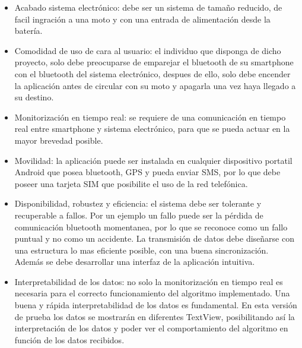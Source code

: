 		\begin{itemize}
			\item Acabado sistema electr\'onico: debe ser un sistema de tamaño reducido, de facil ingraci\'on a una moto y con una entrada de alimentaci\'on desde la bater\'ia.
			
			\item Comodidad de uso de cara al usuario: el individuo que disponga de dicho proyecto, solo debe preocuparse de emparejar el bluetooth de su smartphone con el bluetooth del sistema electr\'onico, despues de ello, solo debe encender la aplicaci\'on antes de circular con su moto y apagarla una vez haya llegado a su destino. 
			
			\item Monitorizaci\'on en tiempo real: se requiere de una comunicaci\'on en tiempo real entre smartphone y sistema electr\'onico, para que se pueda actuar en la mayor brevedad posible.
			
			\item Movilidad: la aplicaci\'on puede ser instalada en cualquier dispositivo portatil Android que posea bluetooth, GPS y pueda enviar SMS, por lo que debe poseer una tarjeta SIM que posibilite el uso de la red telef\'onica.
			
			\item Disponibilidad, robustez y eficiencia: el sistema debe ser tolerante y recuperable a fallos. Por un ejemplo un fallo puede ser la p\'erdida de comunicaci\'on bluetooth momentanea, por lo que se reconoce como un fallo puntual y no como un accidente. La transmisi\'on de datos debe diseñarse con una estructura lo mas eficiente posible, con una buena sincronizaci\'on. Adem\'as se debe desarrollar una interfaz de la aplicaci\'on intuitiva.
			
			\item Interpretabilidad de los datos: no solo la monitorizaci\'on en tiempo real es necesaria para el correcto funcionamiento del algoritmo implementado. Una buena y r\'apida interpretabilidad de los datos es fundamental. En esta versi\'on de prueba los datos se mostrar\'an en diferentes TextView, posibilitando as\'i la interpretaci\'on de los datos y poder ver el comportamiento del algoritmo en funci\'on de los datos recibidos.
			
		\end{itemize}
		
	\newpage
	$\ $